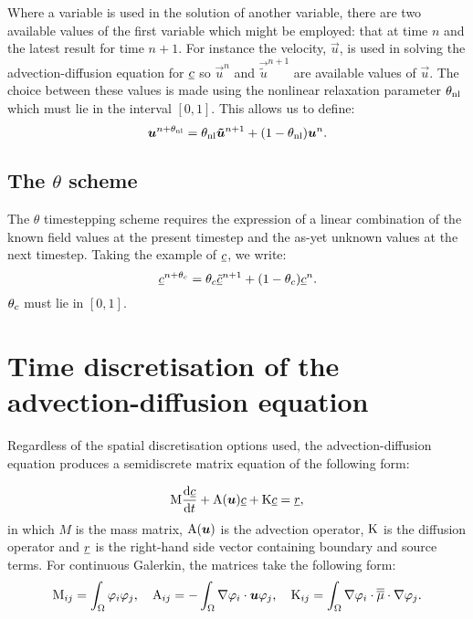 Where a variable is used in the solution of another variable, there are two
available values of the first variable which might be employed: that at time
$n$ and the latest result for time $n+1$. For instance the velocity,
$\vec u$, is used in solving the advection-diffusion equation for
$\underline{c}$ so $\vec{u}^n$ and $\vec{\tilde u}^{n+1}$ are available values
of $\vec u$. The choice between these values is made using the
nonlinear relaxation parameter $\theta_{\mathrm{nl}}$ which must lie in the interval
$[0,1]$. This allows us to define:
\begin{equation}
  \label{eq:thetanl}
  {\mbox{\boldmath$u$}}^{n+\theta_{\mathrm{nl}}}=\theta_{\mathrm{nl}}{\mbox{\boldmath$\tilde u$}}^{n+1} + (1-\theta_{\mathrm{nl}}){\mbox{\boldmath$u$}}^n.
\end{equation}

\subsection{The $\theta$ scheme}

The $\theta$ timestepping scheme requires the expression of a linear
combination of the known field values at the present timestep and the as-yet
unknown values at the next timestep. Taking the example of $\underline{c}$, we write:
\begin{equation}
  \label{eq:thetac}
  \underline{c}^{n+\theta_c}=\theta_c\underline{\tilde c}^{n+1}+(1-\theta_c)\underline{c}^{n}.
\end{equation}
$\theta_c$ must lie in $[0,1]$.

\section{Time discretisation of the advection-diffusion equation}
\label{sect:ND_time_disct_adv_diff}

Regardless of the spatial discretisation options used, the
advection-diffusion equation produces a semidiscrete matrix equation of the
following form:

\begin{equation}
  \mathrm{M} \frac{\mathrm{d}\underline{c}}{\mathrm{d} t}+\mathrm{A}({\mbox{\boldmath$u$}})\underline{c}+\mathrm{K}\underline{c}=\underline{r},
\end{equation}
in which $M$ is the mass matrix, $\mathrm{A}({\mbox{\boldmath$u$}})$ is the advection
operator, $\mathrm{K}$ is the diffusion operator and $\underline{r}$ is the
right-hand side vector containing boundary and source terms. For continuous
Galerkin, the matrices take the following form:
\begin{equation}
  \mathrm{M}_{ij}=\int_\Omega \varphi_i\varphi_j, \quad
  \mathrm{A}_{ij}=-\int_\Omega \nabla\varphi_i\cdot{\mbox{\boldmath$u$}} \varphi_j, \quad
  \mathrm{K}_{ij}=\int_\Omega \nabla\varphi_i\cdot \overline{\overline{\mu}}\cdot\nabla \varphi_j.
\end{equation}

